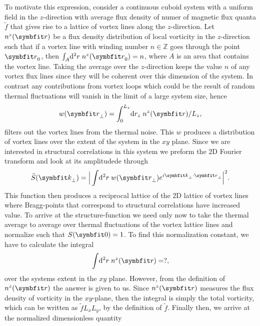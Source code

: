 To motivate this expression, consider a continuous cuboid system with a uniform field in the $z$-direction with average flux density of numer of magnetic flux quanta $\tilde{f}$ that gives rise to a lattice of vortex
lines along the $z$-direction. Let $n^z(\v{r})$ be a flux density distribution of local vorticity in the $z$-direction such that if a vortex line with winding number $n\in\mathbb{Z}$ goes through the point $\v{r}_0$,
then $\int_A\!\mathrm{d}^2r\;n^z(\v{r}_0) = n$, where $A$ is an area that contains the vortex line.
Taking the average over the $z$-direction keeps the value $n$ of any vortex flux lines since they will be coherent over this
dimension of the system. In contrast any contributions from vortex loops which could be the result of random thermal fluctuations will vanish in the limit of a large system size, hence
\begin{equation}
    w(\v{r}_\perp) = \int_0^{L_z}\!\mathrm{d}r_z\;n^z(\v{r}) / L_z,
    \label{eq:Vor:Symm:FS:Cont:xyDist}
\end{equation}
filters out the vortex lines from the thermal noise. This $w$ produces a distribution of vortex lines over the extent of the system in the $xy$ plane.
Since we are interested in structural correlations in this system we preform the $2$D Fourier transform and look at its amplitudede through
\begin{equation}
    \label{eq:Vor:Symm:FS:Cont:unnormalized}
    \tilde{S}(\v{k}_\perp) = \Big|\int\!\mathrm{d}^2r\;w(\v{r}_\perp)e^{i\v{k}_\perp\cdot\v{r}_\perp}\Big|^2.
\end{equation}
This function then produces a reciprocal lattice of the $2$D lattice of vortex lines where Bragg-points that correspond to structural correlations have increased value. To arrive at the structure-function
we need only now to take the thermal average to average over thermal fluctuations of the vortex lattice lines and normalize such that $S(\v{0})=1$. To find this normalization constant, we have to
calculate the integral
\begin{equation}
    \label{eq:Vor:Symm:FS:Cont:normalizationInt}
    \int\!\mathrm{d}^2r\;n^z(\v{r}) = ?,
\end{equation}
over the systems extent in the $xy$ plane. However, from the definition of $n^z(\v{r})$ the answer is given to us. Since $n^z(\v{r})$ measures the flux density of vorticity in the $xy$-plane, then the integral is simply the total vorticity,
which can be written as $\tilde{f}L_xL_y$, by the definition of $\tilde{f}$. Finally then, we arrive at the normalized dimensionless quantity
